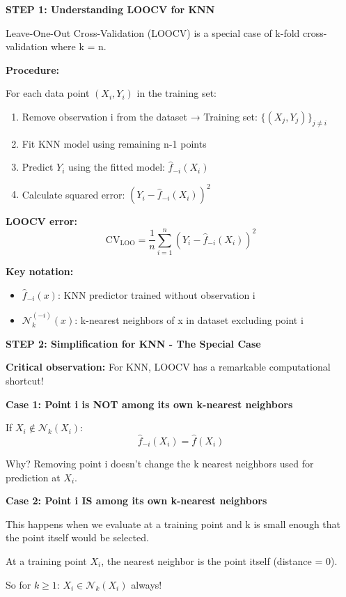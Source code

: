 \documentclass[12pt]{article}
\begin{document}
\begin{solution}
\textbf{STEP 1: Understanding LOOCV for KNN}

Leave-One-Out Cross-Validation (LOOCV) is a special case of k-fold cross-validation where k = n.

\textbf{Procedure:}

For each data point $(X_i, Y_i)$ in the training set:
\begin{enumerate}
    \item Remove observation i from the dataset → Training set: $\{(X_j, Y_j)\}_{j \neq i}$
    \item Fit KNN model using remaining n-1 points
    \item Predict $Y_i$ using the fitted model: $\hat{f}_{-i}(X_i)$
    \item Calculate squared error: $(Y_i - \hat{f}_{-i}(X_i))^2$
\end{enumerate}

\textbf{LOOCV error:}
\[
\text{CV}_{\text{LOO}} = \frac{1}{n}\sum_{i=1}^n (Y_i - \hat{f}_{-i}(X_i))^2
\]

\textbf{Key notation:}
\begin{itemize}
    \item $\hat{f}_{-i}(x)$: KNN predictor trained without observation i
    \item $\mathcal{N}_k^{(-i)}(x)$: k-nearest neighbors of x in dataset excluding point i
\end{itemize}

\textbf{STEP 2: Simplification for KNN - The Special Case}

\textbf{Critical observation:} For KNN, LOOCV has a remarkable computational shortcut!

\textbf{Case 1: Point i is NOT among its own k-nearest neighbors}

If $X_i \notin \mathcal{N}_k(X_i)$:
\[
\hat{f}_{-i}(X_i) = \hat{f}(X_i)
\]

Why? Removing point i doesn't change the k nearest neighbors used for prediction at $X_i$.

\textbf{Case 2: Point i IS among its own k-nearest neighbors}

This happens when we evaluate at a training point and k is small enough that the point itself would be selected.

At a training point $X_i$, the nearest neighbor is the point itself (distance = 0).

So for $k \geq 1$: $X_i \in \mathcal{N}_k(X_i)$ always!


\end{solution}
\end{document}
